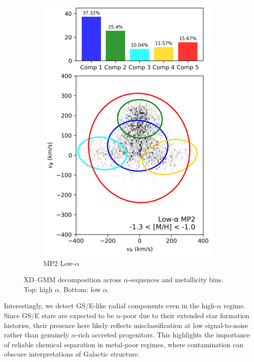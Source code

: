 \documentclass[a4paper,10pt]{article}
\begin{document}
\begin{multicols}{2}
\begin{figure}[H]
\begin{subfigure}[t]{0.24\linewidth}
    \includegraphics[width=\linewidth]{../figures/gmm_mp2_low_alpha_k6.png}
    \caption{MP2 Low-$\alpha$}
  \end{subfigure}

  \caption{XD–GMM decomposition across $\alpha$-sequences and metallicity bins. Top: high $\alpha$. Bottom: low $\alpha$.}
  \label{fig:gmm_alpha_bins}
\end{figure}

Interestingly, we detect GS/E-like radial components even in the high-$\alpha$ regime. 
Since GS/E stars are expected to be $\alpha$-poor due to their extended star formation histories, 
their presence here likely reflects misclassification at low signal-to-noise rather than genuinely 
$\alpha$-rich accreted progenitors. This highlights the importance of reliable chemical 
separation in metal-poor regimes, where contamination can obscure interpretations of Galactic structure.















\end{multicols}
\end{document}
